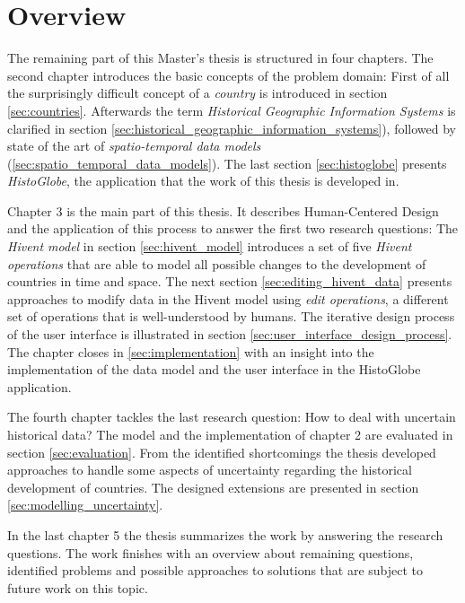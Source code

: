 \section{Overview} %
\label{sec:overview}

The remaining part of this Master's thesis is structured in four chapters. The second chapter introduces the basic concepts of the problem domain: First of all the surprisingly difficult concept of a \emph{country} is introduced in section \ref{sec:countries}. Afterwards the term \emph{Historical Geographic Information Systems} is clarified in section \ref{sec:historical_geographic_information_systems}), followed by state of the art of \emph{spatio-temporal data models} (\ref{sec:spatio_temporal_data_models}). The last section \ref{sec:histoglobe} presents \emph{HistoGlobe}, the application that the work of this thesis is developed in.

Chapter 3 is the main part of this thesis. It describes Human-Centered Design and the application of this process to answer the first two research questions: The \emph{Hivent model} in section \ref{sec:hivent_model} introduces a set of five \emph{Hivent operations} that are able to model all possible changes to the development of countries in time and space. The next section \ref{sec:editing_hivent_data} presents approaches to modify data in the Hivent model using \emph{edit operations}, a different set of operations that is well-understood by humans. The iterative design process of the user interface is illustrated in section \ref{sec:user_interface_design_process}. The chapter closes in \ref{sec:implementation} with an insight into the implementation of the data model and the user interface in the HistoGlobe application.

The fourth chapter tackles the last research question: How to deal with uncertain historical data? The model and the implementation of chapter 2 are evaluated in section \ref{sec:evaluation}. From the identified shortcomings the thesis developed approaches to handle some aspects of uncertainty regarding the historical development of countries. The designed extensions are presented in section \ref{sec:modelling_uncertainty}.

In the last chapter 5 the thesis summarizes the work by answering the research questions. The work finishes with an overview about remaining questions, identified problems and possible approaches to solutions that are subject to future work on this topic.



